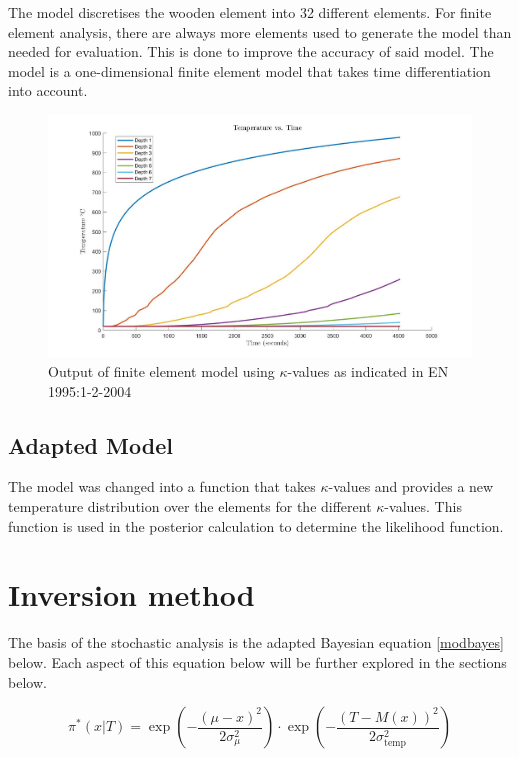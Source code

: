	The model discretises the wooden element into 32 different elements. For finite element analysis, there are always more elements used to generate the model than needed for evaluation. This is done to improve the accuracy of said model.
	The model is a one-dimensional finite element model that takes time differentiation into account.
	
\begin{figure}[H]
	\label{og_modeldata}
	\centering
	\includegraphics[width=\linewidth,]{figures/originalmugraph.jpg}
	\caption{Output of finite element model using $\kappa$-values as indicated in EN 1995:1-2-2004}
\end{figure}	

	\subsection{Adapted Model}	
	The model was changed into a function that takes $\kappa$-values and provides a new temperature distribution over the elements for the different $\kappa$-values. 
	This function is used in the posterior calculation to determine the likelihood function.
	

\section{Inversion method}
The basis of the stochastic analysis is the adapted Bayesian equation \ref{modbayes} below. 
Each aspect of this equation below will be further explored in the sections below.

\begin{equation}
\label{modbayes}
\pi^* (x|T) = \exp\left(-\frac{(\mu - x)^2}{2\sigma_{\mu}^2}\right) \cdot \exp\left(-\frac{\left(T-M(x)\right)^2}{2\sigma_{\text{temp}}^2}\right)
\end{equation}

